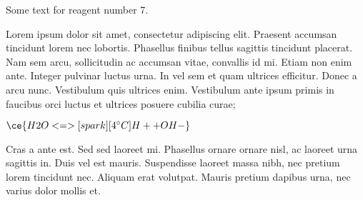 
Some text for reagent number 7.

Lorem ipsum dolor sit amet, consectetur adipiscing elit. Praesent accumsan tincidunt lorem nec lobortis. Phasellus finibus tellus sagittis tincidunt placerat. Nam sem arcu, sollicitudin ac accumsan vitae, convallis id mi. Etiam non enim ante. Integer pulvinar luctus urna. In vel sem et quam ultrices efficitur. Donec a arcu nunc. Vestibulum quis ultrices enim. Vestibulum ante ipsum primis in faucibus orci luctus et ultrices posuere cubilia curae;

$\ce{H2O <=>[spark][4^\circ C] H+ + OH-}$

Cras a ante est. Sed sed laoreet mi. Phasellus ornare ornare nisl, ac laoreet urna sagittis in. Duis vel est mauris. Suspendisse laoreet massa nibh, nec pretium lorem tincidunt nec. Aliquam erat volutpat. Mauris pretium dapibus urna, nec varius dolor mollis et.
